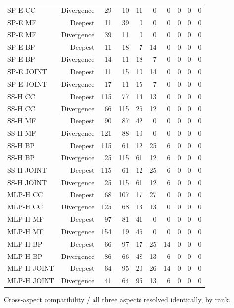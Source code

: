\begin{longtable}{lrrrrrrrrr}
SP-E CC & Divergence & 29 & 10 & 11 & 0 & 0 & 0 & 0 & 0 \\
SP-E MF & Deepest & 11 & 39 & 0 & 0 & 0 & 0 & 0 & 0 \\
SP-E MF & Divergence & 39 & 11 & 0 & 0 & 0 & 0 & 0 & 0 \\
SP-E BP & Deepest & 11 & 18 & 7 & 14 & 0 & 0 & 0 & 0 \\
SP-E BP & Divergence & 14 & 11 & 18 & 7 & 0 & 0 & 0 & 0 \\
SP-E JOINT & Deepest & 11 & 15 & 10 & 14 & 0 & 0 & 0 & 0 \\
SP-E JOINT & Divergence & 17 & 11 & 15 & 7 & 0 & 0 & 0 & 0 \\
SS-H CC & Deepest & 115 & 77 & 14 & 13 & 0 & 0 & 0 & 0 \\
SS-H CC & Divergence & 66 & 115 & 26 & 12 & 0 & 0 & 0 & 0 \\
SS-H MF & Deepest & 90 & 87 & 42 & 0 & 0 & 0 & 0 & 0 \\
SS-H MF & Divergence & 121 & 88 & 10 & 0 & 0 & 0 & 0 & 0 \\
SS-H BP & Deepest & 115 & 61 & 12 & 25 & 6 & 0 & 0 & 0 \\
SS-H BP & Divergence & 25 & 115 & 61 & 12 & 6 & 0 & 0 & 0 \\
SS-H JOINT & Deepest & 115 & 61 & 12 & 25 & 6 & 0 & 0 & 0 \\
SS-H JOINT & Divergence & 25 & 115 & 61 & 12 & 6 & 0 & 0 & 0 \\
MLP-H CC & Deepest & 68 & 107 & 17 & 27 & 0 & 0 & 0 & 0 \\
MLP-H CC & Divergence & 125 & 68 & 13 & 13 & 0 & 0 & 0 & 0 \\
MLP-H MF & Deepest & 97 & 81 & 41 & 0 & 0 & 0 & 0 & 0 \\
MLP-H MF & Divergence & 154 & 19 & 46 & 0 & 0 & 0 & 0 & 0 \\
MLP-H BP & Deepest & 66 & 97 & 17 & 25 & 14 & 0 & 0 & 0 \\
MLP-H BP & Divergence & 86 & 66 & 48 & 13 & 6 & 0 & 0 & 0 \\
MLP-H JOINT & Deepest & 64 & 95 & 20 & 26 & 14 & 0 & 0 & 0 \\
MLP-H JOINT & Divergence & 41 & 64 & 95 & 13 & 6 & 0 & 0 & 0 \\
\bottomrule
\end{longtable}
\endgroup
\par Cross-aspect compatibility / all three aspects resolved identically, by rank.
